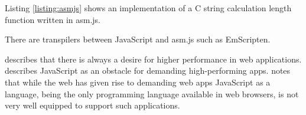 
Listing \ref{listing:asmjs} shows an implementation of a C string calculation length function written in asm.js.

There are transpilers between JavaScript and asm.js such as EmScripten.

\textcite{ReiserBlaser2017} describes that there is always a desire for higher performance in web applications.
\textcite{Zakai2018} describes JavaScript as an obstacle for demanding high-performing apps. 
\textcite{HaasRossbergSchuffTitzerHolmanGohmanWagnerZakaiBastien2017} notes that while the web has given rise to demanding web apps JavaScript as a language, being the only programming language available in web browsers, is not very well equipped to support such applications.

%
